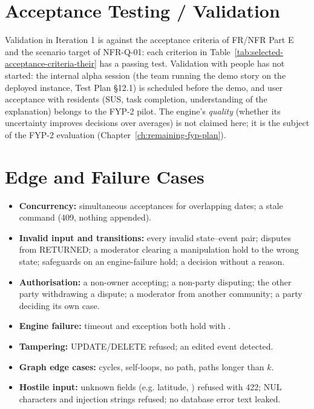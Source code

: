\section{Acceptance Testing / Validation}\label{sec:acceptance-testing-validation}
Validation in Iteration 1 is against the acceptance criteria of FR/NFR Part E and the scenario target of NFR-Q-01: each criterion in Table~\ref{tab:selected-acceptance-criteria-their} has a passing test. Validation with people has not started: the internal alpha session (the team running the demo story on the deployed instance, Test Plan \S{}12.1) is scheduled before the demo, and user acceptance with residents (SUS, task completion, understanding of the explanation) belongs to the FYP-2 pilot. The engine's \textit{quality} (whether its uncertainty improves decisions over averages) is not claimed here; it is the subject of the FYP-2 evaluation (Chapter~\ref{ch:remaining-fyp-plan}).

\section{Edge and Failure Cases}\label{sec:edge-failure-cases}
\begin{itemize}
\item \textbf{Concurrency:} simultaneous acceptances for overlapping dates; a stale command (409, nothing appended).
\item \textbf{Invalid input and transitions:} every invalid state--event pair; disputes from RETURNED; a moderator clearing a manipulation hold to the wrong state; safeguards on an engine-failure hold; a decision without a reason.
\item \textbf{Authorisation:} a non-owner accepting; a non-party disputing; the other party withdrawing a dispute; a moderator from another community; a party deciding its own case.
\item \textbf{Engine failure:} timeout and exception both hold with .
\item \textbf{Tampering:} UPDATE/DELETE refused; an edited event detected.
\item \textbf{Graph edge cases:} cycles, self-loops, no path, paths longer than $k$.
\item \textbf{Hostile input:} unknown fields (e.g. latitude, ) refused with 422; NUL characters and injection strings refused; no database error text leaked.
\end{itemize}

